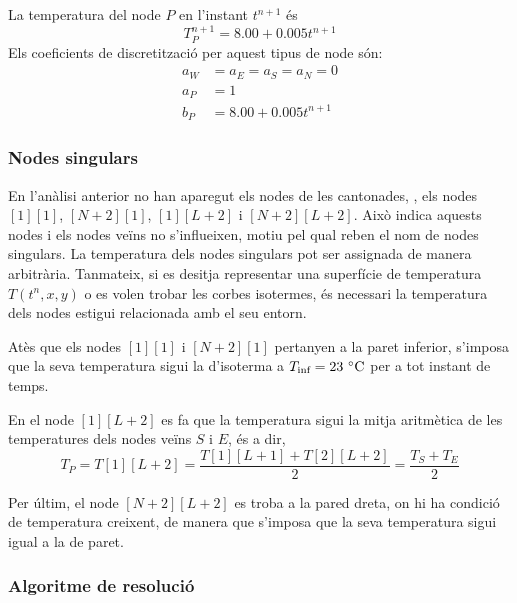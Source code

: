 \noindent
La temperatura del node $P$ en l'instant $t^{n+1}$ és
\begin{equation}
	T_P^{n+1} = 8.00 + 0.005 t^{n+1}
\end{equation}
Els coeficients de discretització per aquest tipus de node són:
\begin{align}
	a_W &= a_E = a_S = a_N = 0 \\
	a_P &= 1 \\
	b_P &= 8.00 + 0.005 t^{n+1}
\end{align}


\subsubsection{Nodes singulars}

En l'anàlisi anterior no han aparegut els nodes de les cantonades, \ie, els nodes $[1][1]$, $[N+2][1]$, $[1][L+2]$ i $[N+2][L+2]$. Això indica aquests nodes i els nodes veïns no s'influeixen, motiu pel qual reben el nom de nodes singulars. La temperatura dels nodes singulars pot ser assignada de manera arbitrària. Tanmateix, si es desitja representar una superfície de temperatura $T(t^n, x, y)$ o es volen trobar les corbes isotermes, és necessari la temperatura dels nodes estigui relacionada amb el seu entorn.

Atès que els nodes $[1][1]$ i $[N+2][1]$ pertanyen a la paret inferior, s'imposa que la seva temperatura sigui la d'isoterma a $T_\text{inf} = 23 \ \celsius$ per a tot instant de temps.

En el node $[1][L+2]$ es fa que la temperatura sigui la mitja aritmètica de les temperatures dels nodes veïns $S$ i $E$, és a dir,
\begin{equation}
	T_P = T[1][L+2] = \frac{T[1][L+1] + T[2][L+2]}{2} = \frac{T_S + T_E}{2}
\end{equation} 

Per últim, el node $[N+2][L+2]$ es troba a la pared dreta, on hi ha condició de temperatura creixent, de manera que s'imposa que la seva temperatura sigui igual a la de paret. 

\subsubsection{Algoritme de resolució}

